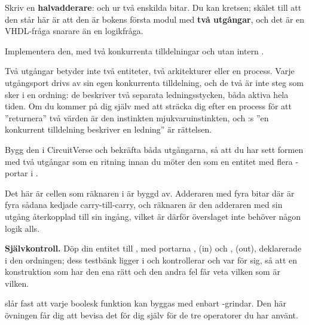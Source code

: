 \label{c1:ex:half_adder}
Skriv en \textbf{halvadderare}:  och  ur två enskilda bitar. Du kan kretsen;
skälet till att den står här är att den är bokens första modul med \textbf{två utgångar}, och det
är en VHDL-fråga snarare än en logikfråga.

 Implementera den, med två konkurrenta tilldelningar och utan intern .

Två utgångar betyder inte två entiteter, två arkitekturer eller en process. Varje utgångsport
drivs av sin egen konkurrenta tilldelning, och de två är inte steg som sker i en ordning: de
beskriver två separata ledningsstycken, båda aktiva hela tiden. Om du kommer på dig själv med att
sträcka dig efter en process för att ”returnera” två värden är den instinkten
mjukvaruinstinkten, och :s ”en konkurrent tilldelning beskriver en ledning”
är rättelsen.

 Bygg den i CircuitVerse och bekräfta båda utgångarna, så att du har sett formen med två
utgångar som en ritning innan du möter den som en entitet med flera -portar i
.

Det här är cellen som räknaren i  är byggd av. Adderaren med
fyra bitar där är fyra sådana kedjade carry-till-carry, och räknaren är den adderaren med sin
utgång återkopplad till sin ingång, vilket är därför överslaget inte behöver någon logik alls.


\begin{selfcheck}
\textbf{Självkontroll.} Döp din entitet till , med portarna , 
(in) och ,  (out), deklarerade i den ordningen; dess testbänk ligger i
 och kontrollerar  och  var för sig, så att en
konstruktion som har den ena rätt och den andra fel får veta vilken som är vilken.
\end{selfcheck}


\label{c1:ex:nand}
 slår fast att varje boolesk funktion kan byggas med enbart
-grindar. Den här övningen får dig att bevisa det för dig själv för de tre operatorer
du har använt.

